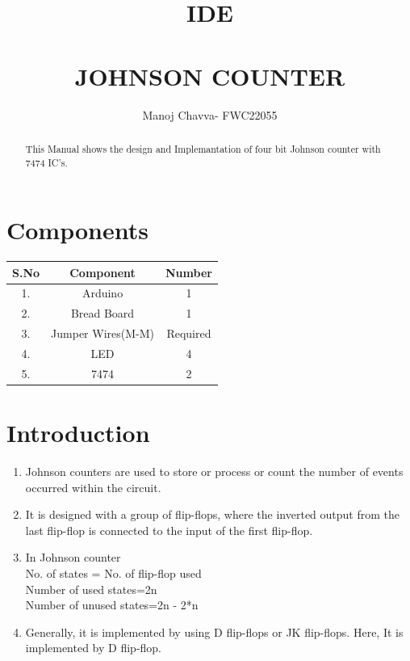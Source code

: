 \documentclass[journal,12pt,twocolumn]{IEEEtran}
\title{IDE  \\ \textbf{\\JOHNSON COUNTER}}
\author{Manoj Chavva- FWC22055}
\begin{document}
\maketitle

\tableofcontents
\vspace{0.5cm}
\begin{abstract}
  This Manual shows the design and Implemantation of four bit Johnson counter with 7474 IC's.
\end{abstract}   


 
     \section{Components}  
       

\begin{tabular}{|c|c|c|}
    \hline 
      \textbf{S.No} & \textbf{Component} & \textbf{Number}\\
      \hline
	1. & Arduino & 1 \\
	2. & Bread Board & 1 \\
	3. & Jumper Wires(M-M) & Required \\
	4. & LED & 4 \\
	5. & 7474 & 2\\
      \hline
      
   \end{tabular}
   

     \vspace{0.35cm}




\section{Introduction}
\begin{enumerate}
  \item Johnson counters are used to store or process or count the number of events occurred within the circuit.
  \item It is designed with a group of flip-flops, where the inverted output from the last flip-flop is connected to the input of the first flip-flop.
  \item In Johnson counter
  \\No. of states = No. of flip-flop used  
\\Number of used states=2n  
\\Number of unused states=2n - 2*n  
\item Generally, it is implemented by using D flip-flops or JK flip-flops. 
Here, It is implemented by D flip-flop.
\end{enumerate}
\end{document}
